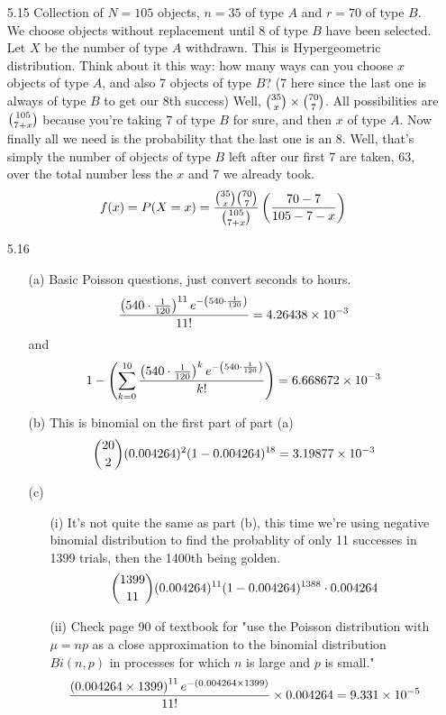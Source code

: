 \documentclass[english, 11pt]{article}
\begin{document}
\begin{itemize}
    \item[5.15] Collection of $N = 105$ objects, $n = 35$ of type $A$ and $r = 70$ of type $B$. We choose objects without replacement until 8 of type $B$ have been selected. Let $X$ be the number of type $A$ withdrawn. This is Hypergeometric distribution. Think about it this way: how many ways can you choose $x$ objects of type $A$, and also 7 objects of type $B$? (7 here since the last one is always of type $B$ to get our 8th success) Well, ${35 \choose x}\times{70 \choose 7}$. All possibilities are ${105 \choose 7 + x}$ because you're taking 7 of type $B$ for sure, and then $x$ of type $A$. Now finally all we need is the probability that the last one is an 8. Well, that's simply the number of objects of type $B$ left after our first 7 are taken, 63, over the total number less the $x$ and 7 we already took.
    \[ f(x) = P(X = x) = \frac{{35 \choose x}{70 \choose 7}}{{105 \choose 7+x}} \left( \frac{70 - 7}{105 - 7 - x} \right)\]

    \item[5.16]
    \begin{itemize}
      \item[(a)] Basic Poisson questions, just convert seconds to hours.
      \[ \frac{\left(540\cdot \frac{1}{120}\right)^{11}e^{-\left(540\cdot \frac{1}{120}\right)}}{11!} = 4.26438\times10^{-3} \]
      and
      \[ 1 - \left( \sum_{k=0}^{10} \frac{\left(540\cdot \frac{1}{120}\right)^{k}e^{-\left(540\cdot \frac{1}{120}\right)}}{k!}\right) = 6.668672\times 10^{-3}\]
      \item[(b)] This is binomial on the first part of part (a)
      \[ {20 \choose 2} (0.004264)^2(1-0.004264)^{18} = 3.19877 \times 10^{-3} \]
      \item[(c)]
      \begin{itemize}
        \item[(i)]It's not quite the same as part (b), this time we're using negative binomial distribution to find the probablity of only 11 successes in 1399 trials, then the 1400th being golden.
      \[ {1399 \choose 11}  (0.004264)^{11}(1-0.004264)^{1388}\cdot 0.004264\]
        \item[(ii)] Check page 90 of textbook for "use the Poisson distribution with $\mu = np$ as a close approximation to the binomial distribution $Bi(n,p)$ in processes for which $n$ is large and $p$ is small."
        \[ \frac{\left( 0.004264 \times 1399 \right)^{11}e^{-\left(0.004264 \times 1399  \right)}}{11!} \times 0.004264 = 9.331\times10^{-5}\]
      \end{itemize}
    \end{itemize}


\end{itemize}
\end{document}
